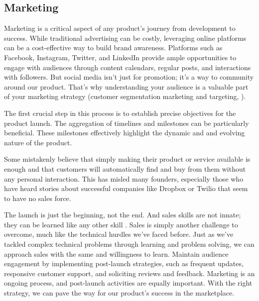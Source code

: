 
\subsection{Marketing}

Marketing is a critical aspect of any product's journey from development to success. While traditional advertising can 
be costly, leveraging online platforms can be a cost-effective way to build brand awareness. Platforms such as Facebook, 
Instagram, Twitter, and LinkedIn provide ample opportunities to engage with audiences through content calendars, 
regular posts, and interactions with followers. But social media isn't just for promotion; it's a way to community 
around our product. That's why understanding your audience is a valuable part of your marketing strategy (customer 
segmentation marketing and targeting, \cite{Fras20}).

The first crucial step in this process is to establish precise objectives for the product launch. The aggregation of 
timelines and milestones can be particularly beneficial. These milestones effectively highlight the dynamic and and 
evolving nature of the product.

Some mistakenly believe that simply making their product or service available is enough and that customers will 
automatically find and buy from them without any personal interaction. This has misled many founders, especially those 
who have heard stories about successful companies like Dropbox or Twilio that seem to have no sales force. 

The launch is just the beginning, not the end. And sales skills are not innate; they can be learned like any other skill 
\cite{Dixo11}. Sales is simply another challenge to overcome, much like the technical hurdles we've faced before. Just 
as we've tackled complex technical problems through learning and problem solving, we can approach sales with the same 
and willingness to learn. Maintain audience engagement by implementing post-launch strategies, such as frequent updates, 
responsive customer support, and soliciting reviews and feedback. Marketing is an ongoing process, and post-launch 
activities are equally important. With the right strategy, we can pave the way for our product's success in the marketplace.
